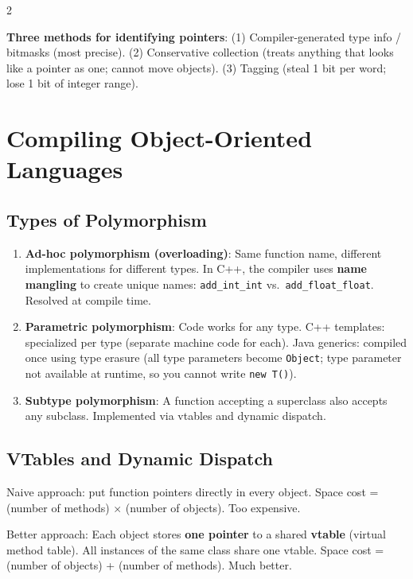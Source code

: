 \documentclass[9pt,landscape]{extarticle}
\begin{document}
\begin{multicols}{2}
\begin{exambox}
\textbf{Three methods for identifying pointers}: (1) Compiler-generated type info / bitmasks (most precise). (2) Conservative collection (treats anything that looks like a pointer as one; cannot move objects). (3) Tagging (steal 1 bit per word; lose 1 bit of integer range).
\end{exambox}

\section{Compiling Object-Oriented Languages}

\subsection{Types of Polymorphism}

\begin{enumerate}
  \item \textbf{Ad-hoc polymorphism (overloading)}: Same function name, different implementations for different types. In C++, the compiler uses \textbf{name mangling} to create unique names: \texttt{add\_int\_int} vs.\ \texttt{add\_float\_float}. Resolved at compile time.
  \item \textbf{Parametric polymorphism}: Code works for any type. C++ templates: specialized per type (separate machine code for each). Java generics: compiled once using type erasure (all type parameters become \texttt{Object}; type parameter not available at runtime, so you cannot write \texttt{new T()}).
  \item \textbf{Subtype polymorphism}: A function accepting a superclass also accepts any subclass. Implemented via vtables and dynamic dispatch.
\end{enumerate}

\subsection{VTables and Dynamic Dispatch}

Naive approach: put function pointers directly in every object. Space cost = (number of methods) $\times$ (number of objects). Too expensive.

Better approach: Each object stores \textbf{one pointer} to a shared \textbf{vtable} (virtual method table). All instances of the same class share one vtable. Space cost = (number of objects) + (number of methods). Much better.


\end{multicols}
\end{document}
